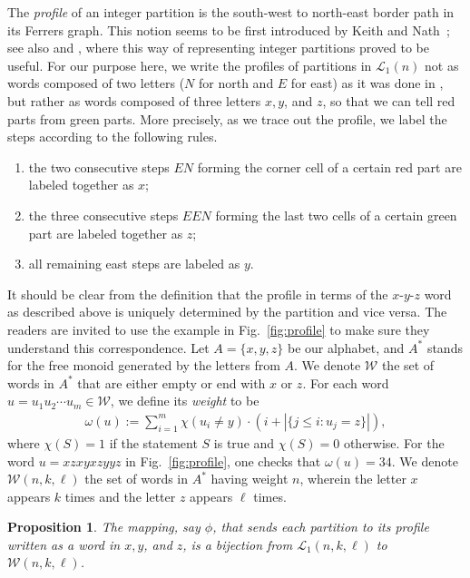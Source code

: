 \documentclass[11pt,reqno]{amsart}
\numberwithin{equation}{section}
\theoremstyle{plain}
\newtheorem{proposition}[theorem]{Proposition}
\theoremstyle{definition}
\renewcommand{\L}{\mathcal{L}}
\newcommand{\W}{\mathcal{W}}
\begin{document}
The {\it profile} of an integer partition is the south-west to north-east border path in its Ferrers graph. This notion seems to be first introduced by Keith and Nath~\cite{KN}; see also \cite{FT18} and \cite{LXY}, where this way of representing integer partitions proved to be useful. For our purpose here, we write the profiles of partitions in $\L_1(n)$ not as words composed of two letters ($N$ for north and $E$ for east) as it was done in \cite{FT18}, but rather as words composed of three letters $x,y$, and $z$, so that we can tell red parts from green parts. More precisely, as we trace out the profile, we label the steps according to the following rules.
\begin{enumerate}
  \item the two consecutive steps $EN$ forming the corner cell of a certain red part are labeled together as $x$;
  \item the three consecutive steps $EEN$ forming the last two cells of a certain green part are labeled together as $z$;
  \item all remaining east steps are labeled as $y$.
\end{enumerate}
It should be clear from the definition that the profile in terms of the $x$-$y$-$z$ word as described above is uniquely determined by the partition and vice versa. The readers are invited to use the example in Fig.~\ref{fig:profile} to make sure they understand this correspondence. Let $A=\{x,y,z\}$ be our alphabet, and $A^*$ stands for the free monoid generated by the letters from $A$. We denote $\W$ the set of words in $A^*$ that are either empty or end with $x$ or $z$. For each word $u=u_1u_2\cdots u_m\in\W$, we define its {\it weight} to be
\begin{align}\label{word weight}
\omega(u):=\sum_{i=1}^m \chi(u_i\neq y)\cdot (i+|\{j\le i:u_j=z\}|),
\end{align}
where $\chi(S)=1$ if the statement $S$ is true and $\chi(S)=0$ otherwise. For the word $u=xzxyxzyyz$ in Fig.~\ref{fig:profile}, one checks that $\omega(u)=34$. We denote $\W(n,k,\ell)$ the set of words in $A^*$ having weight $n$, wherein the letter $x$ appears $k$ times and the letter $z$ appears $\ell$ times.

\begin{proposition}\label{prop:bij-phi}
 The mapping, say $\phi$, that sends each partition to its profile written as a word in $x,y$, and $z$, is a bijection from $\L_1(n,k,\ell)$ to $\W(n,k,\ell)$.
\end{proposition}
\end{document}
